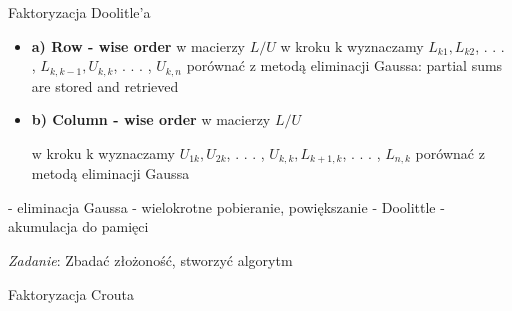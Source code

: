 \begin{frame}{Faktoryzacja Doolitle'a}
\begin{itemize}
\item \textbf{a) Row - wise order } w macierzy $L/U$
w kroku $\mathrm{k}$ wyznaczamy $L_{k1}, L_{k2}$, . . . , $L_{k,k-1}, U_{k,k}$, . . . , $U_{k,n}$ porównać z metodą eliminacji Gaussa: partial sums are stored and retrieved
\item \textbf{b) Column - wise order}  w macierzy $L/U$

$\mathrm{w}$ kroku $\mathrm{k}$ wyznaczamy $U_{1k}, U_{2k}$, . . . , $U_{k,k}, L_{k+1,k}$, . . . , $L_{n,k}$ porównać z metodą eliminacji Gaussa
\end{itemize}


- eliminacja Gaussa - wielokrotne pobieranie, powiększanie \newline - Doolittle - akumulacja do pamięci

\begin{flushright}
{\it Zadanie}: Zbadać złożoność, stworzyć algorytm
\end{flushright} 

\end{frame}
\begin{frame}{Faktoryzacja Crouta}

\end{frame}
